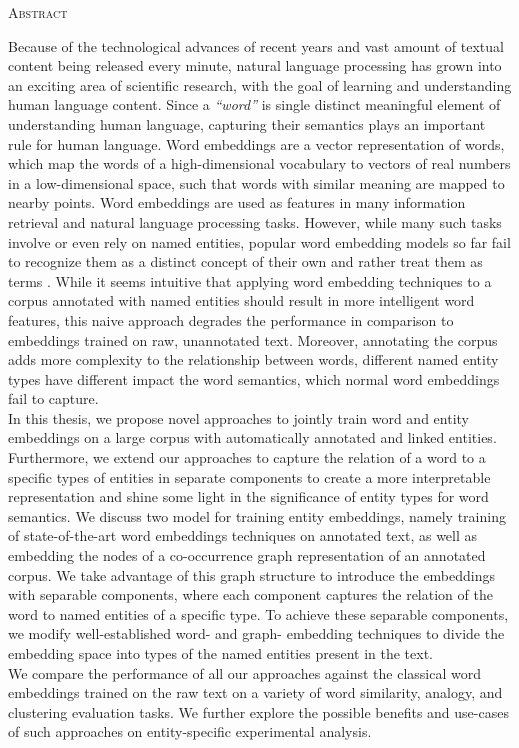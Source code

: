 \begin{center}
  \textsc{Abstract}
\end{center}
%
\noindent
%
Because of the technological advances of recent years and vast amount of textual content being released every minute, natural language processing has grown into an exciting area of scientific research, with the goal of learning and understanding human language content. Since a \emph{``word''} is single distinct meaningful element of understanding human language, capturing their semantics plays an important rule for human language. Word embeddings are a vector representation of words, which map the words of a high-dimensional vocabulary to vectors of real numbers in a low-dimensional space, such that words with similar meaning are mapped to nearby points. Word embeddings are used as features in many information retrieval and natural language processing tasks. However, while many such tasks involve or even rely on named entities, popular word embedding models so far fail to recognize them as a distinct concept of their own and rather treat them as terms . While it seems intuitive that  applying word embedding techniques to a corpus annotated with named entities should result in more intelligent word features, this naive approach  degrades the performance in comparison to embeddings trained on raw, unannotated text. Moreover, annotating the corpus adds more complexity to the relationship between words, different named entity types have different impact the word semantics, which normal word embeddings fail to capture.
\\
In this thesis, we propose novel approaches to jointly train word and entity embeddings on a large corpus with automatically annotated and linked entities. Furthermore, we extend our approaches to capture the relation of a word to a specific types of entities in separate components to create a more interpretable representation and shine some light in the significance of entity types for word semantics. We discuss two model for training entity embeddings, namely training of state-of-the-art word embeddings techniques on annotated text, as well as embedding the nodes of a co-occurrence graph representation of an annotated corpus. We take advantage of this graph structure to introduce the embeddings with separable components, where each component captures the relation of the word to named entities of a specific type. To achieve these separable components, we modify well-established word- and graph- embedding techniques to divide the embedding space into types of the named entities present in the text. \\
We compare the performance of all our approaches against the classical word embeddings trained on the raw text on a variety of word similarity, analogy, and clustering evaluation tasks. We further explore the possible benefits and use-cases of such approaches on entity-specific experimental analysis. 


